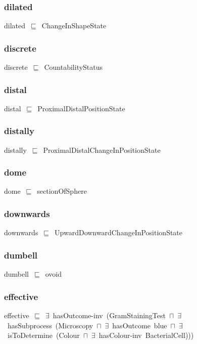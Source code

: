 \documentclass{article}
\begin{document}
\subsubsection*{dilated}

dilated~\ensuremath{\sqsubseteq}~ChangeInShapeState~

\subsubsection*{discrete}

discrete~\ensuremath{\sqsubseteq}~CountabilityStatus~

\subsubsection*{distal}

distal~\ensuremath{\sqsubseteq}~ProximalDistalPositionState~

\subsubsection*{distally}

distally~\ensuremath{\sqsubseteq}~ProximalDistalChangeInPositionState~

\subsubsection*{dome}

dome~\ensuremath{\sqsubseteq}~sectionOfSphere~

\subsubsection*{downwards}

downwards~\ensuremath{\sqsubseteq}~UpwardDownwardChangeInPositionState~

\subsubsection*{dumbell}

dumbell~\ensuremath{\sqsubseteq}~ovoid~

\subsubsection*{effective}

effective~\ensuremath{\sqsubseteq}~\ensuremath{\exists}~hasOutcome-inv~(GramStainingTest~\ensuremath{\sqcap}~\ensuremath{\exists}~hasSubprocess~(Microscopy~\ensuremath{\sqcap}~\ensuremath{\exists}~hasOutcome~blue~\ensuremath{\sqcap}~\ensuremath{\exists}~isToDetermine~(Colour~\ensuremath{\sqcap}~\ensuremath{\exists}~hasColour-inv~BacterialCell)))~
\end{document}
